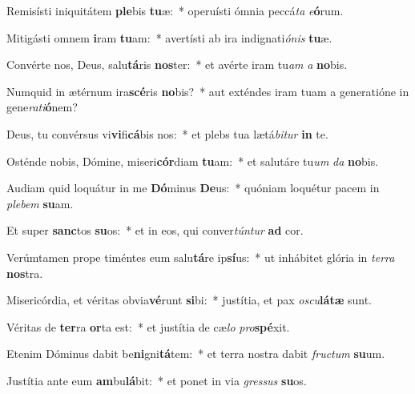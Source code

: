\item Remisísti iniquitátem \textbf{ple}bis \textbf{tu}æ:~* operuísti ómnia peccá\textit{ta} \textit{e}\textbf{ó}rum.
\item Mitigásti omnem \textbf{i}ram \textbf{tu}am:~* avertísti ab ira indignati\textit{ó}\textit{nis} \textbf{tu}æ.
\item Convérte nos, Deus, salu\textbf{tá}ris \textbf{nos}ter:~* et avérte iram tu\textit{am} \textit{a} \textbf{no}bis.
\item Numquid in ætérnum ira\textbf{scé}ris \textbf{no}bis?~* aut exténdes iram tuam a generatióne in gene\textit{ra}\textit{ti}\textbf{ó}nem?
\item Deus, tu convérsus vi\textbf{vi}fi\textbf{cá}bis nos:~* et plebs tua lætá\textit{bi}\textit{tur} \textbf{in} te.
\item Osténde nobis, Dómine, miseri\textbf{cór}diam \textbf{tu}am:~* et salutáre tu\textit{um} \textit{da} \textbf{no}bis.
\item Audiam quid loquátur in me \textbf{Dó}minus \textbf{De}us:~* quóniam loquétur pacem in \textit{ple}\textit{bem} \textbf{su}am.
\item Et super \textbf{sanc}tos \textbf{su}os:~* et in eos, qui conver\textit{tún}\textit{tur} \textbf{ad} cor.
\item Verúmtamen prope timéntes eum salu\textbf{tá}re ip\textbf{sí}us:~* ut inhábitet glória in \textit{ter}\textit{ra} \textbf{nos}tra.
\item Misericórdia, et véritas obvia\textbf{vé}runt \textbf{si}bi:~* justítia, et pax \textit{os}\textit{cu}\textbf{lá}\textbf{tæ} sunt.
\item Véritas de \textbf{ter}ra \textbf{or}ta est:~* et justítia de cæ\textit{lo} \textit{pro}\textbf{spé}xit.
\item Etenim Dóminus dabit be\textbf{ni}gni\textbf{tá}tem:~* et terra nostra dabit \textit{fruc}\textit{tum} \textbf{su}um.
\item Justítia ante eum \textbf{am}bu\textbf{lá}bit:~* et ponet in via \textit{gres}\textit{sus} \textbf{su}os.
